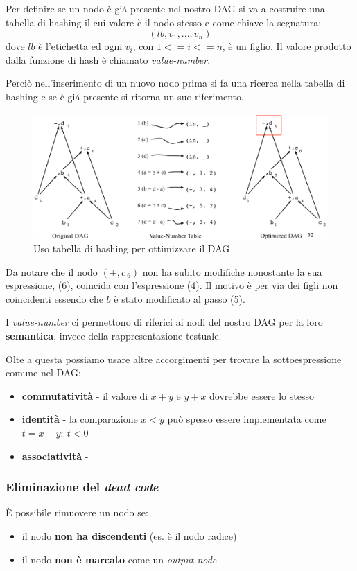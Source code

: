 Per definire se un nodo \`e gi\'a presente nel nostro DAG si va a costruire una
tabella di hashing il cui valore \`e il nodo stesso e come chiave la segnatura:
$$(lb,v_1,...,v_n)$$
dove $lb$ \`e l'etichetta ed ogni $v_i$, con $1 <= i <= n$, \`e un figlio. Il
valore prodotto dalla funzione di hash \`e chiamato \textit{value-number}.

Perci\`o nell'inserimento di un nuovo nodo prima si fa una ricerca nella
tabella di hashing e se \`e gi\'a presente si ritorna un suo riferimento.

\begin{figure}[H]
  \centering
  \includegraphics[scale=0.4]{res/image/original_optimized_dag}
  \caption{Uso tabella di hashing per ottimizzare il DAG}
  \label{img:original_optimized_dag}
\end{figure}

Da notare che il nodo $(+,c_{\ 6})$ non ha subito modifiche nonostante la sua
espressione, (6), coincida con l'espressione (4). Il motivo \`e per via dei
figli non coincidenti essendo che $b$ \`e stato modificato al passo (5).

I \textit{value-number} ci permettono di riferici ai nodi del nostro DAG per
la loro \textbf{semantica}, invece della rappresentazione testuale.

Olte a questa possiamo usare altre accorgimenti per trovare la sottoespressione
comune nel DAG:
\begin{itemize}
\item \textbf{commutativit\`a} - il valore di $x+y$ e $y+x$ dovrebbe essere lo
stesso
\item \textbf{identit\`a} - la comparazione $x<y$ pu\`o spesso essere
implementata come $t=x-y; \ t<0$
\item \textbf{associativit\`a} -
\end{itemize}

\subsubsection{Eliminazione del \textit{dead code}}
\`E possibile rimuovere un nodo se:
\begin{itemize}
\item il nodo \textbf{non ha discendenti} (es. \`e il nodo radice)
\item il nodo \textbf{non \`e marcato} come un \textit{output node}
\end{itemize}

